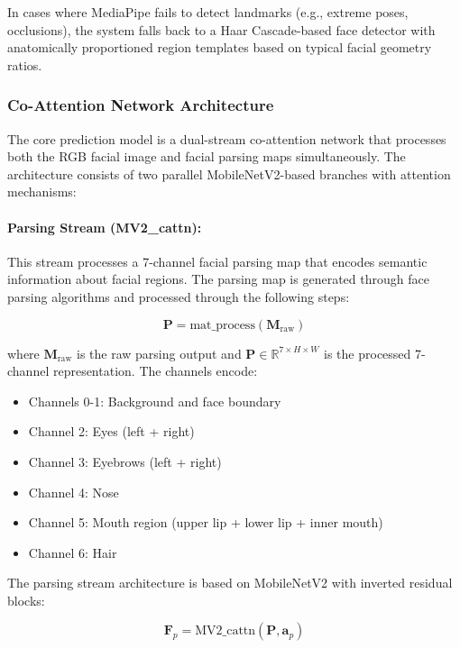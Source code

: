 In cases where MediaPipe fails to detect landmarks (e.g., extreme poses, occlusions), the system falls back to a Haar Cascade-based face detector with anatomically proportioned region templates based on typical facial geometry ratios.

\subsubsection{Co-Attention Network Architecture}

The core prediction model is a dual-stream co-attention network that processes both the RGB facial image and facial parsing maps simultaneously. The architecture consists of two parallel MobileNetV2-based branches with attention mechanisms:

\paragraph{Parsing Stream (MV2\_cattn):}
This stream processes a 7-channel facial parsing map that encodes semantic information about facial regions. The parsing map is generated through face parsing algorithms and processed through the following steps:

\begin{equation}
\mathbf{P} = \text{mat\_process}(\mathbf{M}_{\text{raw}})
\end{equation}

where $\mathbf{M}_{\text{raw}}$ is the raw parsing output and $\mathbf{P} \in \mathbb{R}^{7 \times H \times W}$ is the processed 7-channel representation. The channels encode:
\begin{itemize}
    \item Channels 0-1: Background and face boundary
    \item Channel 2: Eyes (left + right)
    \item Channel 3: Eyebrows (left + right)
    \item Channel 4: Nose
    \item Channel 5: Mouth region (upper lip + lower lip + inner mouth)
    \item Channel 6: Hair
\end{itemize}

The parsing stream architecture is based on MobileNetV2 with inverted residual blocks:

\begin{equation}
\mathbf{F}_p = \text{MV2\_cattn}(\mathbf{P}, \mathbf{a}_p)
\end{equation}

